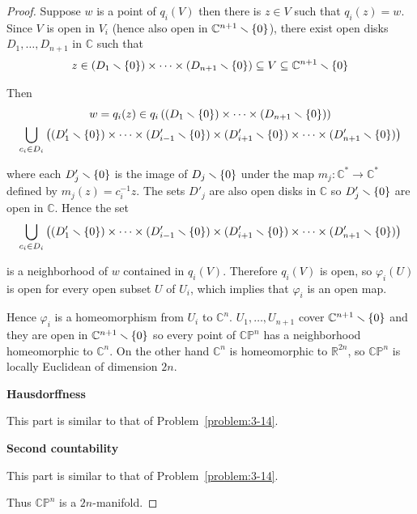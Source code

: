 \begin{proof}
    Suppose $w$ is a point of $q_{i}(V)$ then there is $z\in V$ such that $q_{i}(z) = w$. Since $V$ is open in $V_{i}$ (hence also open in $\mathbb{C}^{n+1}\smallsetminus\left\{{0}\right\}$), there exist open disks $D_{1}, \ldots, D_{n+1}$ in $\mathbb{C}$ such that
    \begin{align*}
        z \in (D_{1}\smallsetminus\left\{{0}\right\}) \times \cdots \times (D_{n+1}\smallsetminus\left\{{0}\right\}) \subseteq V \subseteq \mathbb{C}^{n+1}\smallsetminus\left\{{0}\right\}
    \end{align*}

    Then
    \begin{multline*}
        w = q_{i}(z) \in q_{i}\left((D_{1}\smallsetminus\left\{{0}\right\}) \times \cdots \times (D_{n+1}\smallsetminus\left\{{0}\right\})\right) \\
        \bigcup_{c_{i} \in D_{i}}\left( (D_{1}' \smallsetminus \left\{{0}\right\}) \times \cdots \times (D_{i-1}' \smallsetminus \left\{{0}\right\}) \times (D_{i+1}' \smallsetminus \left\{{0}\right\}) \times \cdots \times (D_{n+1}' \smallsetminus \left\{{0}\right\}) \right)
    \end{multline*}

    where each $D_{j}'\smallsetminus\left\{{0}\right\}$ is the image of $D_{j}\smallsetminus\left\{{0}\right\}$ under the map $m_{j}: \mathbb{C}^{*}\to \mathbb{C}^{*}$ defined by $m_{j}(z) = c_{i}^{-1}z$. The sets $D'_{j}$ are also open disks in $\mathbb{C}$ so $D_{j}'\smallsetminus\left\{{0}\right\}$ are open in $\mathbb{C}$. Hence the set
    \begin{align*}
        \bigcup_{c_{i} \in D_{i}}\left( (D_{1}' \smallsetminus \left\{{0}\right\}) \times \cdots \times (D_{i-1}' \smallsetminus \left\{{0}\right\}) \times (D_{i+1}' \smallsetminus \left\{{0}\right\}) \times \cdots \times (D_{n+1}' \smallsetminus \left\{{0}\right\}) \right)
    \end{align*}

    is a neighborhood of $w$ contained in $q_{i}(V)$. Therefore $q_{i}(V)$ is open, so $\varphi_{i}(U)$ is open for every open subset $U$ of $U_{i}$, which implies that $\varphi_{i}$ is an open map.

    Hence $\varphi_{i}$ is a homeomorphism from $U_{i}$ to $\mathbb{C}^{n}$. $U_{1}, \ldots, U_{n+1}$ cover $\mathbb{C}^{n+1}\smallsetminus\left\{{0}\right\}$ and they are open in $\mathbb{C}^{n+1}\smallsetminus\left\{{0}\right\}$ so every point of $\mathbb{CP}^{n}$ has a neighborhood homeomorphic to $\mathbb{C}^{n}$. On the other hand $\mathbb{C}^{n}$ is homeomorphic to $\mathbb{R}^{2n}$, so $\mathbb{CP}^{n}$ is locally Euclidean of dimension $2n$.

    \textbf{Hausdorffness}

    This part is similar to that of Problem~\ref{problem:3-14}.

    \textbf{Second countability}

    This part is similar to that of Problem~\ref{problem:3-14}.

    Thus $\mathbb{CP}^{n}$ is a $2n$-manifold.
\end{proof}

